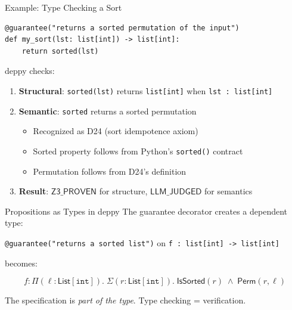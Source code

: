 \documentclass[aspectratio=169,11pt]{beamer}
\begin{document}
\begin{frame}[fragile]{Example: Type Checking a Sort}
\begin{lstlisting}[language=deppy]
@guarantee("returns a sorted permutation of the input")
def my_sort(lst: list[int]) -> list[int]:
    return sorted(lst)
\end{lstlisting}

\vspace{0.5em}
deppy checks:
\begin{enumerate}
\item \textbf{Structural}: \texttt{sorted(lst)} returns \texttt{list[int]}
  when \texttt{lst : list[int]} {\color{trustgreen}\checkmark}
\item \textbf{Semantic}: \texttt{sorted} returns a sorted permutation
  \begin{itemize}
  \item Recognized as D24 (sort idempotence axiom)
  \item Sorted property follows from Python's \texttt{sorted()} contract
  \item Permutation follows from D24's definition {\color{trustgreen}\checkmark}
  \end{itemize}
\item \textbf{Result}: $\mathsf{Z3\_PROVEN}$ for structure,
  $\mathsf{LLM\_JUDGED}$ for semantics
\end{enumerate}
\end{frame}

\begin{frame}{Propositions as Types in deppy}
The guarantee decorator creates a dependent type:

\vspace{0.5em}
\texttt{@guarantee("returns a sorted list")} on \texttt{f : list[int] -> list[int]}

becomes:

\[
  f : \Pi(\ell : \mathsf{List}[\mathtt{int}]).\;
  \Sigma(r : \mathsf{List}[\mathtt{int}]).\;
  \mathsf{IsSorted}(r) \;\wedge\; \mathsf{Perm}(r, \ell)
\]

\vspace{0.5em}
The specification is \emph{part of the type}.
Type checking = verification.
\end{frame}
\end{document}
